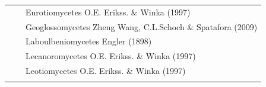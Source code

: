 \documentclass[]{book}
\begin{document}
\begin{longtable}[]{@{}lll@{}}
\begin{minipage}[t]{0.32\columnwidth}
\strut
\end{minipage} & \begin{minipage}[t]{0.28\columnwidth}\raggedright\strut
\strut
\end{minipage} & \begin{minipage}[t]{0.31\columnwidth}\raggedright\strut
Eurotiomycetes O.E. Erikss. \& Winka (1997)\strut
\end{minipage}\tabularnewline
\begin{minipage}[t]{0.32\columnwidth}\raggedright\strut
\strut
\end{minipage} & \begin{minipage}[t]{0.28\columnwidth}\raggedright\strut
\strut
\end{minipage} & \begin{minipage}[t]{0.31\columnwidth}\raggedright\strut
Geoglossomycetes Zheng Wang, C.L.Schoch \& Spatafora (2009)\strut
\end{minipage}\tabularnewline
\begin{minipage}[t]{0.32\columnwidth}\raggedright\strut
\strut
\end{minipage} & \begin{minipage}[t]{0.28\columnwidth}\raggedright\strut
\strut
\end{minipage} & \begin{minipage}[t]{0.31\columnwidth}\raggedright\strut
Laboulbeniomycetes Engler (1898)\strut
\end{minipage}\tabularnewline
\begin{minipage}[t]{0.32\columnwidth}\raggedright\strut
\strut
\end{minipage} & \begin{minipage}[t]{0.28\columnwidth}\raggedright\strut
\strut
\end{minipage} & \begin{minipage}[t]{0.31\columnwidth}\raggedright\strut
Lecanoromycetes O.E. Erikss. \& Winka (1997)\strut
\end{minipage}\tabularnewline
\begin{minipage}[t]{0.32\columnwidth}\raggedright\strut
\strut
\end{minipage} & \begin{minipage}[t]{0.28\columnwidth}\raggedright\strut
\strut
\end{minipage} & \begin{minipage}[t]{0.31\columnwidth}\raggedright\strut
Leotiomycetes O.E. Erikss. \& Winka (1997)\strut
\end{minipage}\tabularnewline
\begin{minipage}[t]{0.32\columnwidth}\raggedright\strut

\end{minipage}
\end{longtable}
\end{document}
